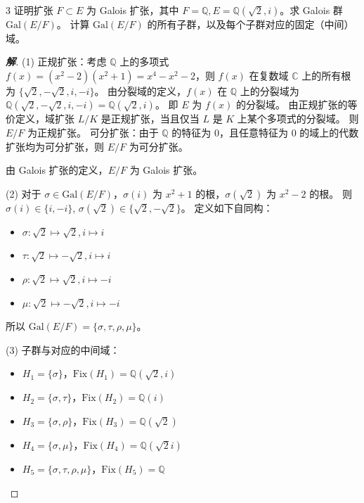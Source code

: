 \documentclass[12pt, a4paper]{article}
\newenvironment{solution}{
    \begin{proof}[\textbf{解}]
}{
    \end{proof}
}
\begin{document}
\begin{problem}{3}
    证明扩张 $F \subset E$ 为 Galois 扩张，其中 $F=\mathbb{Q}, E=\mathbb{Q}(\sqrt{2},i)$。求 Galois 群 $\mathrm{Gal}(E/F)$。
    计算 $\mathrm{Gal}(E/F)$ 的所有子群，以及每个子群对应的固定（中间）域。
\end{problem}
\begin{solution}
    (1) 正规扩张：考虑 $\mathbb{Q}$ 上的多项式 $f(x)=(x^2-2)(x^2+1)=x^4-x^2-2$，则 $f(x)$ 在复数域 $\mathbb{C}$ 上的所有根为 $\{\sqrt{2},-\sqrt{2},i,-i\}$。
    由分裂域的定义，$f(x)$ 在 $\mathbb{Q}$ 上的分裂域为 $\mathbb{Q}(\sqrt{2},-\sqrt{2},i,-i)=\mathbb{Q}(\sqrt{2},i)$。
    即 $E$ 为 $f(x)$ 的分裂域。
    由正规扩张的等价定义，域扩张 $L/K$ 是正规扩张，当且仅当 $L$ 是 $K$ 上某个多项式的分裂域。
    则 $E/F$ 为正规扩张。
    可分扩张：由于 $\mathbb{Q}$ 的特征为 0，且任意特征为 0 的域上的代数扩张均为可分扩张，则 $E/F$ 为可分扩张。
    
    由 Galois 扩张的定义，$E/F$ 为 Galois 扩张。

    (2) 对于 $\sigma \in \mathrm{Gal}(E/F)$，$\sigma(i)$ 为 $x^2+1$ 的根，$\sigma(\sqrt{2})$ 为 $x^2-2$ 的根。
    则 $\sigma(i) \in \{i, -i\}$, $\sigma(\sqrt{2}) \in \{\sqrt{2}, -\sqrt{2}\}$。
    定义如下自同构：
    \begin{itemize}
        \item $\sigma: \sqrt{2} \mapsto \sqrt{2}, i \mapsto i$
        \item $\tau: \sqrt{2} \mapsto -\sqrt{2}, i \mapsto i$
        \item $\rho: \sqrt{2} \mapsto \sqrt{2}, i \mapsto -i$
        \item $\mu: \sqrt{2} \mapsto -\sqrt{2}, i \mapsto -i$
    \end{itemize}
    所以 $\mathrm{Gal}(E/F) = \{\sigma, \tau, \rho, \mu\}$。

    (3) 子群与对应的中间域：
    \begin{itemize}
        \item $H_1 = \{\sigma\}$，$\mathrm{Fix}(H_1) = \mathbb{Q}(\sqrt{2},i)$
        \item $H_2 = \{\sigma, \tau\}$，$\mathrm{Fix}(H_2) = \mathbb{Q}(i)$
        \item $H_3 = \{\sigma, \rho\}$，$\mathrm{Fix}(H_3) = \mathbb{Q}(\sqrt{2})$
        \item $H_4 = \{\sigma, \mu\}$，$\mathrm{Fix}(H_4) = \mathbb{Q}(\sqrt{2}i)$
        \item $H_5 = \{\sigma, \tau, \rho, \mu\}$，$\mathrm{Fix}(H_5) = \mathbb{Q}$
    \end{itemize}
\end{solution}
    
\end{document}
